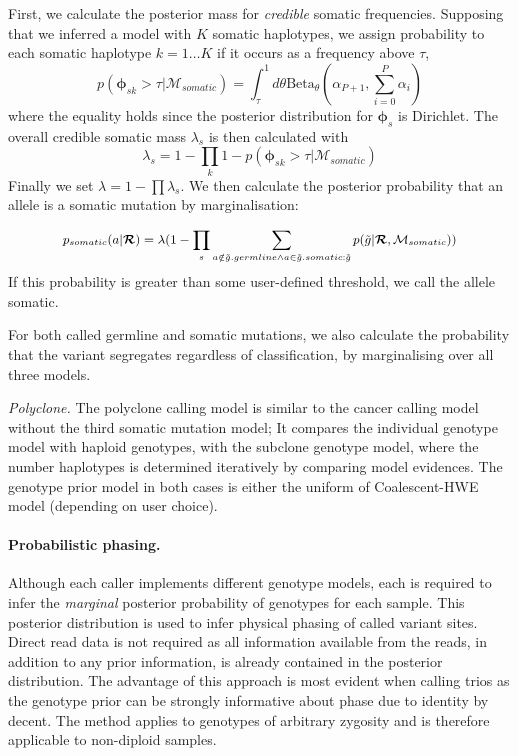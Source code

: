 \documentclass[notitlepage, twocolumn, 10pt]{article}
\begin{document}
First, we calculate the posterior mass for \emph{credible} somatic frequencies. Supposing that we inferred a model with $K$ somatic haplotypes, we assign probability to each somatic haplotype $k = 1 \dots K$ if it occurs as a frequency above $\tau$,
\begin{equation*}
p(\boldsymbol{\phi}_{sk} > \tau | \mathcal{M}_{somatic}) = \int_{\tau}^1 d\theta \text{Beta}_{\theta}(\alpha_{P + 1}, \sum_{i = 0}^{P} \alpha_i)
\end{equation*}
where the equality holds since the posterior distribution for $\boldsymbol{\phi}_{s}$ is Dirichlet. The overall credible somatic mass $\lambda_{s}$ is then calculated with
\begin{equation*}
\lambda_{s} = 1 - \prod_k 1 - p(\boldsymbol{\phi}_{sk} > \tau | \mathcal{M}_{somatic})
\end{equation*}
Finally we set $\lambda = 1 - \prod \lambda_s$. We then calculate the posterior probability that an allele is a somatic mutation by marginalisation:

\begin{equation*}\small
p_{somatic}(a | \boldsymbol{\mathcal{R}}) = \lambda(1 - \prod_s \sum_{a \notin \tilde{g}.germline \land a \in \tilde{g}.somatic : \tilde{g}}p(\tilde{g} | \boldsymbol{\mathcal{R}}, \mathcal{M}_{somatic}))
\end{equation*}
If this probability is greater than some user-defined threshold, we call the allele somatic.

For both called germline and somatic mutations, we also calculate the probability that the variant segregates regardless of classification, by marginalising over all three models.

\vspace{3mm}
\noindent\emph{Polyclone.} The polyclone calling model is similar to the cancer calling model without the third somatic mutation model; It compares the individual genotype model with haploid genotypes, with the subclone genotype model, where the number haplotypes is determined iteratively by comparing model evidences. The genotype prior model in both cases is either the uniform of Coalescent-HWE model (depending on user choice).

\paragraph*{Probabilistic phasing.} Although each caller implements different genotype models, each is required to infer the \emph{marginal} posterior probability of genotypes for each sample. This posterior distribution is used to infer physical phasing of called variant sites. Direct read data is not required as all information available from the reads, in addition to any prior information, is already contained in the posterior distribution. The advantage of this approach is most evident when calling trios as the genotype prior can be strongly informative about phase due to identity by decent. The method applies to genotypes of arbitrary zygosity and is therefore applicable to non-diploid samples.
\end{document}
